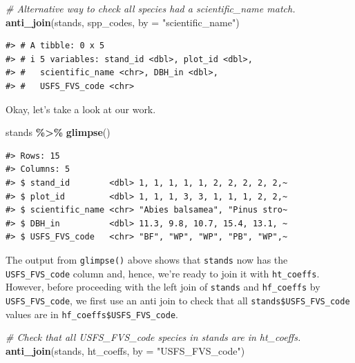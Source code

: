 \documentclass[
  11pt,
]{krantz}
\newenvironment{Shaded}{\begin{snugshade}}{\end{snugshade}}
\newcommand{\CommentTok}[1]{\textcolor[rgb]{0.56,0.35,0.01}{\textit{#1}}}
\newcommand{\DataTypeTok}[1]{\textcolor[rgb]{0.13,0.29,0.53}{#1}}
\newcommand{\KeywordTok}[1]{\textcolor[rgb]{0.13,0.29,0.53}{\textbf{#1}}}
\newcommand{\NormalTok}[1]{#1}
\newcommand{\OperatorTok}[1]{\textcolor[rgb]{0.81,0.36,0.00}{\textbf{#1}}}
\newcommand{\StringTok}[1]{\textcolor[rgb]{0.31,0.60,0.02}{#1}}
\theoremstyle{definition}
\theoremstyle{definition}
\theoremstyle{definition}
\theoremstyle{definition}
\theoremstyle{remark}
\begin{document}
\begin{Shaded}
\begin{Highlighting}[]
\CommentTok{\# Alternative way to check all species had a scientific\_name match.}
\KeywordTok{anti\_join}\NormalTok{(stands, spp\_codes, }\DataTypeTok{by =} \StringTok{"scientific\_name"}\NormalTok{)}
\end{Highlighting}
\end{Shaded}

\begin{verbatim}
#> # A tibble: 0 x 5
#> # i 5 variables: stand_id <dbl>, plot_id <dbl>,
#> #   scientific_name <chr>, DBH_in <dbl>,
#> #   USFS_FVS_code <chr>
\end{verbatim}

Okay, let's take a look at our work.

\begin{Shaded}
\begin{Highlighting}[]
\NormalTok{stands }\OperatorTok{\%\textgreater{}\%}\StringTok{ }\KeywordTok{glimpse}\NormalTok{()}
\end{Highlighting}
\end{Shaded}

\begin{verbatim}
#> Rows: 15
#> Columns: 5
#> $ stand_id        <dbl> 1, 1, 1, 1, 1, 2, 2, 2, 2, 2,~
#> $ plot_id         <dbl> 1, 1, 1, 3, 3, 1, 1, 1, 2, 2,~
#> $ scientific_name <chr> "Abies balsamea", "Pinus stro~
#> $ DBH_in          <dbl> 11.3, 9.8, 10.7, 15.4, 13.1, ~
#> $ USFS_FVS_code   <chr> "BF", "WP", "WP", "PB", "WP",~
\end{verbatim}

The output from \texttt{glimpse()} above shows that \texttt{stands} now has the \texttt{USFS\_FVS\_code} column and, hence, we're ready to join it with \texttt{ht\_coeffs}. However, before proceeding with the left join of \texttt{stands} and \texttt{hf\_coeffs} by \texttt{USFS\_FVS\_code}, we first use an anti join to check that all \texttt{stands\$USFS\_FVS\_code} values are in \texttt{hf\_coeffs\$USFS\_FVS\_code}.

\begin{Shaded}
\begin{Highlighting}[]
\CommentTok{\# Check that all USFS\_FVS\_code species in stands are in ht\_coeffs.}
\KeywordTok{anti\_join}\NormalTok{(stands, ht\_coeffs, }\DataTypeTok{by =} \StringTok{"USFS\_FVS\_code"}\NormalTok{)}
\end{Highlighting}
\end{Shaded}
\end{document}
